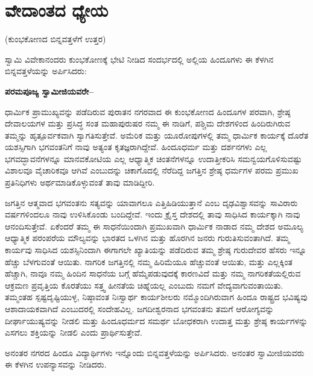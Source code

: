 
\chapter{ವೇದಾಂತದ ಧ್ಯೇಯ}%

\begin{center}
(ಕುಂಭಕೋಣದ ಬಿನ್ನವತ್ತಳೆಗೆ ಉತ್ತರ)
\end{center}

ಸ್ವಾಮಿ ವಿವೇಕಾನಂದರು ಕುಂಭಕೋಣಕ್ಕೆ ಭೇಟಿ ನೀಡಿದ ಸಂದರ್ಭದಲ್ಲಿ ಅಲ್ಲಿಯ ಹಿಂದೂಗಳು ಈ ಕೆಳಗಿನ ಬಿನ್ನವತ್ತಳೆಯನ್ನು ಅರ್ಪಿಸಿದರು:

\vskip 0.2cm

\textbf{ಪರಮಪೂಜ್ಯ ಸ್ವಾಮೀಜಿಯವರೇ–}

\vskip 0.2cm

ಧಾರ್ಮಿಕ ಪ್ರಾಮುಖ್ಯವನ್ನು ಪಡೆದಿರುವ ಪುರಾತನ ನಗರವಾದ ಈ ಕುಂಭಕೋಣದ ಹಿಂದೂಗಳ ಪರವಾಗಿ, ಶ್ರೇಷ್ಠ ದೇವಾಲಯಗಳ ಮತ್ತು ಪ್ರಸಿದ್ಧ ಸಂತ ಮಹಾಪುರುಷರ ನಮ್ಮ ಈ ನಾಡಿಗೆ, ಪಶ್ಚಿಮ ದೇಶಗಳಿಂದ ಹಿಂದಿರುಗಿರುವ ತಮ್ಮನ್ನು ಹೃತ್ಪೂರ್ವಕವಾಗಿ ಸ್ವಾಗತಿಸುತ್ತೇವೆ. ಅಮೆರಿಕ ಮತ್ತು ಯೂರೋಪುಗಳಲ್ಲಿ ತಮ್ಮ ಧಾರ್ಮಿಕ ಕಾರ್ಯಕ್ಕೆ ದೊರೆತ ಯಶಸ್ಸಿಗಾಗಿ ಭಗವಂತನಿಗೆ ನಾವು ಅತ್ಯಂತ ಕೃತಜ್ಞರಾಗಿದ್ದೇವೆ. ಹಿಂದೂಧರ್ಮ ಮತ್ತು ದರ್ಶನಗಳು ಎಲ್ಲ ಭಗವದ್ಭಾವನೆಗಳನ್ನೂ ಮಾನವಕೋಟಿಯ ಎಲ್ಲ ಆಧ್ಯಾತ್ಮಿಕ ಚಿಂತನೆಗಳನ್ನೂ ಉದಾತ್ತೀಕರಿಸಿ ಸಮನ್ವಯಗೊಳಿಸುವಷ್ಟು ವಿಶಾಲವೂ ವೈಚಾರಿಕವೂ ಆಗಿವೆ ಎಂಬುದನ್ನು ಚಿಕಾಗೊದಲ್ಲಿ ನೆರೆದಿದ್ದ ಜಗತ್ತಿನ ಶ್ರೇಷ್ಠ ಧರ್ಮಗಳ ಪರಮ ಪ್ರಮುಖ ಪ್ರತಿನಿಧಿಗಳು ಅರ್ಥಮಾಡಿಕೊಳ್ಳುವಂತೆ ತಾವು ಮಾಡಿದ್ದೀರಿ.

\vskip 0.2cm

ಜಗತ್ತಿನ ಆತ್ಮವಾದ ಭಗವಂತನು ಸತ್ಯವನ್ನು ಯಾವಾಗಲೂ ಎತ್ತಿಹಿಡಿಯುತ್ತಾನೆ ಎಂಬ ದೃಢವಿಶ್ವಾಸವನ್ನು ಸಾವಿರಾರು ವರ್ಷಗಳಿಂದಲೂ ನಾವು ಉಳಿಸಿಕೊಂಡು ಬಂದಿದ್ದೇವೆ. ಇಂದು ಕ್ರೈಸ್ತ ದೇಶದಲ್ಲಿ ತಾವು ಸಾಧಿಸಿದ ಕಾರ್ಯಕ್ಕಾಗಿ ನಾವು ಆನಂದಿಸುತ್ತೇವೆ. ಏಕೆಂದರೆ ತಮ್ಮ ಈ ಸಾಧನೆಯಿಂದಾಗಿ ಪ್ರಮುಖವಾಗಿ ಧಾರ್ಮಿಕ ನಾಡಾದ ನಮ್ಮ ದೇಶದ ಅಮೂಲ್ಯ ಆಧ್ಯಾತ್ಮಿಕ ಪರಂಪರೆಯ ಮೌಲ್ಯವನ್ನು ಭಾರತದ ಒಳಗಿನ ಮತ್ತು ಹೊರಗಿನ ಜನರು ಗುರುತಿಸುವಂತಾಗಿದೆ. ತಮ್ಮ ಕಾರ್ಯವು ಸಾಧಿಸಿದ ಯಶಸ್ಸಿನಿಂದಾಗಿ ಈಗಾಗಲೇ ಖ್ಯಾತಿಯನ್ನು ಪಡೆದಿರುವ ತಮ್ಮ ಶ್ರೇಷ್ಠ ಗುರುದೇವರ ಹೆಸರು ಇನ್ನೂ ಹೆಚ್ಚು ಬೆಳಗುವಂತೆ ಆಯಿತು. ನಾಗರಿಕ ಜಗತ್ತಿನಲ್ಲಿ ನಮ್ಮ ಹಿರಿಮೆಯೂ ಹೆಚ್ಚುವಂತೆ ಆಯಿತು, ಮತ್ತು ಎಲ್ಲಕ್ಕಿಂತ ಹೆಚ್ಚಾಗಿ, ನಾವೂ ನಮ್ಮ ಹಿಂದಿನ ಸಾಧನೆಯ ಬಗ್ಗೆ ಹೆಮ್ಮೆಪಡುವುದಕ್ಕೆ ಕಾರಣವಿದೆ ಮತ್ತು ನಮ್ಮ ನಾಗರಿಕತೆಯಲ್ಲಿರುವ ಆಕ್ರಮಣ ಪ್ರವೃತ್ತಿಯ ಕೊರತೆಯು ಸತ್ತ್ವ ಹೀನತೆಯ ಚಿಹ್ನೆಯಲ್ಲ ಎಂಬುದು ನಮಗೆ ವೇದ್ಯವಾಗುವಂತಾಯಿತು. ತಮ್ಮಂತಹ ಸ್ಪಷ್ಟದೃಷ್ಟಿಯುಳ್ಳ, ನಿಷ್ಠಾವಂತ ನಿಃಸ್ವಾರ್ಥ ಕಾರ್ಯಶೀಲರು ನಮ್ಮೊಂದಿಗಿರುವಾಗ ಹಿಂದೂ ರಾಷ್ಟ್ರದ ಭವಿಷ್ಯವು ಆಶಾದಾಯಕ\-ವಾಗಿದೆ ಎಂಬುದರಲ್ಲಿ ಸಂದೇಹವಿಲ್ಲ. ಜಗದೀಶ್ವರನಾದ ಭಗವಂತನು ತಮಗೆ ಆರೋಗ್ಯವನ್ನು ದೀರ್ಘಾಯುಷ್ಯವನ್ನು ನೀಡಲಿ ಮತ್ತು ಹಿಂದೂಧರ್ಮದ ಸಮರ್ಥ ಬೋಧಕರಾಗಿ ಉದಾತ್ತ ಮತ್ತು ಶ್ರೇಷ್ಠ ಕಾರ್ಯಗಳನ್ನು ಎಸಗಲು ಶಕ್ತಿಯನ್ನು ನೀಡಲಿ ಎಂದು ಪ್ರಾರ್ಥಿಸುತ್ತೇವೆ.

\vskip 0.2cm

ಅನಂತರ ನಗರದ ಹಿಂದೂ ವಿದ್ಯಾರ್ಥಿಗಳು ಇನ್ನೊಂದು ಬಿನ್ನವತ್ತಳೆಯನ್ನು ಅರ್ಪಿಸಿ\-ದರು. ಅನಂತರ ಸ್ವಾಮೀಜಿಯವರು ಈ ಕೆಳಗಿನ ಉಪನ್ಯಾಸವನ್ನು ನೀಡಿದರು.


